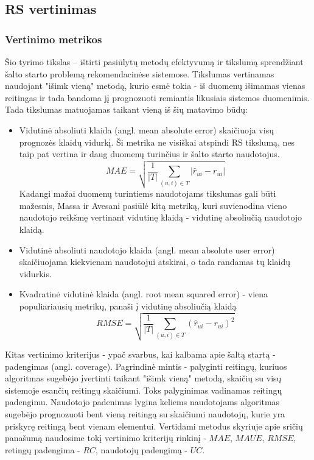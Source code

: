 \documentclass{VUMIFInfMagistrinis}
\begin{document}
\subsection{RS vertinimas}
\subsubsection{Vertinimo metrikos}
\indent
Šio tyrimo tikslas – ištirti pasiūlytų metodų efektyvumą ir tikslumą sprendžiant šalto starto problemą rekomendacinėse sistemose. Tikslumas vertinamas naudojant "išimk vieną" metodą, kurio esmė tokia - iš duomenų išimamas vienas reitingas ir tada bandoma jį prognozuoti remiantis likusiais sistemos duomenimis. Tada tikslumas matuojamas taikant vieną iš šių matavimo būdų:
\begin{itemize}
	\item Vidutinė absoliuti klaida (angl. mean absolute error) skaičiuoja visų prognozės klaidų vidurkį. Ši metrika ne visiškai atspindi RS tikslumą, nes taip pat vertina ir daug duomenų turinčius ir šalto starto naudotojus.
	\begin{equation}
	MAE = \sqrt{\frac{1}{|T|}\sum\limits_{(u,i)\in T} |\hat{r}_{ui} - r_{ui}|}
	\end{equation}
	Kadangi mažai duomenų turintiems naudotojams tikslumas gali būti mažesnis, Massa ir Avesani pasiūlė kitą metriką, kuri suvienodina vieno naudotojo reikšmę vertinant vidutinę klaidą - vidutinę absoliučią naudotojo klaidą.
	\item Vidutinė absoliuti naudotojo klaida (angl. mean absolute user error) skaičiuojama kiekvienam naudotojui atskirai, o tada randamas tų klaidų vidurkis.
	\item Kvadratinė vidutinė klaida (angl. root mean squared error) - viena populiariausių metrikų, panaši į vidutinę absoliučią klaidą
	\begin{equation}
	RMSE = \sqrt{\frac{1}{|T|}\sum\limits_{(u,i)\in T} (\hat{r}_{ui} - r_{ui})^2}
	\end{equation}
\end{itemize}
Kitas vertinimo kriterijus - ypač svarbus, kai kalbama apie šaltą startą - padengimas (angl. coverage). Pagrindinė mintis - palyginti reitingų, kuriuos algoritmas sugebėjo įvertinti taikant "išimk vieną" metodą, skaičių su visų sistemoje esančių reitingų skaičiumi. Toks palyginimas vadinamas reitingų padengimu. Naudotojo padenimas lygina keliems naudotojams algoritmas sugebėjo prognozuoti bent vieną reitingą su skaičiumi naudotojų, kurie yra priskyrę reitingą bent vienam elementui.
\newline
Vertidami metodus skyriuje apie sričių panašumą naudosime tokį vertinimo kriterijų rinkinį - $MAE$, $MAUE$, $RMSE$, retingų padengima - $RC$, naudotojų padengimą - $UC$.
\end{document}
